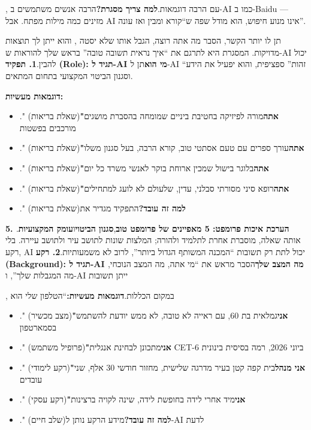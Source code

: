 
, עם הרבה דוגמאות.\textbf{למה צריך מסגרת?}הרבה אנשים משתמשים ב-AI כמו ב-Baidu — מזינים כמה מילות מפתח. אבל AI אינו מנוע חיפוש, הוא מודל שפה ש“קורא ומבין ואז עונה”.

\begin{tcbinfo}{תן לו יותר הקשר, הסבר מה אתה רוצה, הגבל אותו שלא יסטה}
, והוא ייתן לך תוצאות מדויקות. המסגרת היא לתרגם את “איך נראית תשובה טובה” בראש שלך להוראות ש-AI יכול להבין.\textbf{1. תפקיד (Role): תגיד ל-AI מי הוא}תן ל-AI “זהות” ספציפית, והוא יפעיל את הידע וסגנון הביטוי המקצועי בתחום המתאים.

\end{tcbinfo}


\textbf{דוגמאות מעשיות:}


\begin{itemize}
  \item ." (שאלת בריאות)\textbf{"אתה}מורה לפיזיקה בחטיבת ביניים שמומחה בהסברת מושגים מורכבים בפשטות
  \item ." (שאלת בריאות)\textbf{"אתה}עורך ספרים עם טעם אסתטי טוב, קורא הרבה, בעל סגנון משלו
  \item ." (שאלת בריאות)\textbf{"אתה}בלוגר בישול שמכין ארוחת בוקר לאנשי משרד כל יום
  \item ." (שאלת בריאות)\textbf{"אתה}רופא סיני מסורתי סבלני, עדין, שלעולם לא לועג למתחילים
  \item ." (שאלת בריאות)\textbf{למה זה עובד?}התפקיד מגדיר את
\end{itemize}

\textbf{5. הערכת איכות פרומפט: 5 מאפיינים של פרומפט טוב},\textbf{סגנון הביטוי}ו\textbf{עומק המקצועיות}. אותה שאלה, מוסברת אחרת לתלמיד ולהורה; המלצות שונות לתושב עיר ולתושב עיירה. בלי רקע, AI יכול לתת רק תשובות “המכנה המשותף הגדול ביותר”, לרוב לא משמעותיות.\textbf{2. רקע (Background): תגיד ל-AI מה המצב שלך}הסבר מראש את “מי אתה, מה המצב הנוכחי, מה המגבלות שלך”, ו-AI ייתן תשובות


, במקום הכללות.\textbf{דוגמאות מעשיות:}“הטלפון שלי הוא


\begin{itemize}
  \item ." (מצב מכשיר)\textbf{"אני}גמלאית בת 60, עם ראייה לא טובה, לא ממש יודעת להשתמש בסמארטפון
  \item ." (פרופיל משתמש)\textbf{"אני}מתכונן לבחינת אנגלית CET-6 ביוני 2026, רמה בסיסית בינונית
  \item ." (רקע לימודי)\textbf{"אני מנהל}בית קפה קטן בעיר מדרגה שלישית, מחזור חודשי 30 אלף, שני עובדים
  \item ." (רקע עסקי)\textbf{"אני}מיד אחרי לידה בחופשת לידה, שינה לקויה ברצינות
  \item ." (שלב חיים)\textbf{למה זה עובד?}מידע הרקע נותן ל-AI לדעת
\end{itemize}

